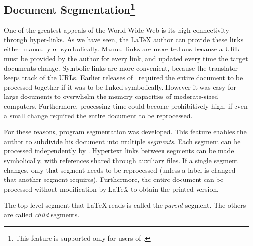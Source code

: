 



\subsection{Document Segmentation\protect\footnote{This feature
is supported only for users of \LaTeXe.}\label{Segmentation}}%
\tableofchildlinks*\htmlrule
{}%
One of the greatest appeals of the World-Wide Web is its high
connectivity through hyper-links.  As we have seen, the \LaTeX{} 
author can provide these links either manually or symbolically.
Manual links are more tedious because a URL must be provided
by the author for every link, and updated every time the target
documents change.
%
Symbolic links are more convenient, 
because the translator keeps track of the URLs.  
Earlier releases of \latextohtml\ required the entire document 
to be processed together if it was to be linked symbolically.  
However it was easy for large documents to overwhelm 
the memory capacities of moderate-sized computers.  
Furthermore, processing time could become prohibitively high, 
if even a small change required the entire document to be reprocessed.

%
\html{\\}%
For these reasons, program segmentation was developed.
This feature enables the author to subdivide his document
into multiple \textit{segments}\label{segments}.
Each segment can be processed independently by \latextohtml.
Hypertext links between segments can be made symbolically,
with references shared through auxiliary files.  
If a single segment changes, only that segment needs to be reprocessed 
(unless a label is changed that another segment requires).  
Furthermore, the entire document can be processed 
without modification by \LaTeX{} to obtain the printed version.  

%
\html{\\}\noindent
The top level segment that \LaTeX{} reads is called the \emph{parent} segment.
\html{\\}
The others are called \emph{child} segments.

